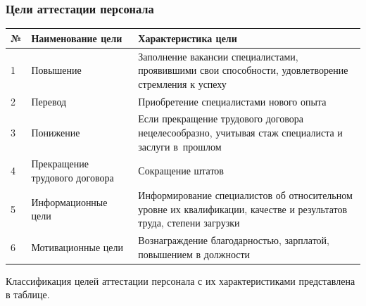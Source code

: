 \documentclass{../industrial-development}
\begin{document}
\begin{frame} \frametitle{Цели аттестации персонала}
    
\begin{table}[h]
\begin{center}
\begin{tabular}{|p{}|p{4cm}|p{5cm}|}
\hline
\tiny \textbf{№} & \tiny \textbf{Наименование цели} & \tiny \textbf{Характеристика цели} \\
\hline
\tiny 1 & \tiny Повышение & \tiny Заполнение вакансии специалистами, проявившими свои способности, удовлетворение стремления к успеху \\
\hline
\tiny 2 & \tiny Перевод & \tiny Приобретение специалистами нового опыта \\
\hline
\tiny 3 & \tiny Понижение & \tiny Если прекращение трудового договора нецелесообразно, учитывая стаж специалиста и заслуги в~прошлом \\
\hline
\tiny 4 & \tiny Прекращение трудового договора &
\tiny Сокращение штатов \\
\hline
\tiny 5 & \tiny Информационные цели & \tiny Информирование специалистов об относительном уровне их квалификации, качестве и результатов труда, степени загрузки \\
\hline
\tiny 6  & \tiny Мотивационные цели & \tiny Вознаграждение благодарностью, зарплатой, повышением в должности \\
\hline
\end{tabular}
\end{center}
\end{table}

	
\end{frame}

\lecturenotes

Классификация целей аттестации персонала с их характеристиками представлена в таблице.

\end{document}
